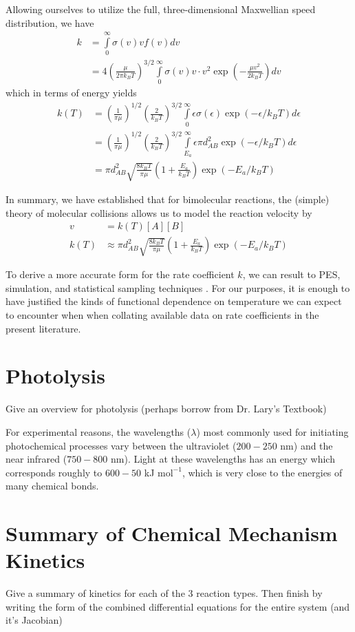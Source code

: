 Allowing ourselves to utilize the full, three-dimensional Maxwellian speed distribution, we have
\begin{equation}
  \begin{aligned}
  k &= \int\limits_0^\infty \sigma(v)v f(v) dv \\
  &= 4\left(\frac{\mu}{2\pi k_BT} \right)^{3/2}\int\limits_0^\infty \sigma(v)v \cdot v^2\exp\left(-\frac{\mu v^2}{2k_BT} \right)dv
  \end{aligned}
\end{equation}
which in terms of energy yields
\begin{equation}
  \begin{aligned}
  k(T) &= \left(\frac{1}{\pi \mu} \right)^{1/2}\left(\frac{2}{k_BT}\right)^{3/2}\int\limits_{0}^{\infty}\epsilon\sigma(\epsilon)\exp(-\epsilon/k_BT)d\epsilon \\
  &= \left(\frac{1}{\pi \mu} \right)^{1/2}\left(\frac{2}{k_BT}\right)^{3/2}\int\limits_{E_a}^{\infty}\epsilon\pi d_{AB}^2\exp(-\epsilon/k_BT)d\epsilon \\
  &= \pi d_{AB}^2 \sqrt{\frac{8k_BT}{\pi \mu}}\left(1 + \frac{E_a}{k_BT} \right)\exp(-E_a/k_BT)
  \end{aligned}
\end{equation}

In summary, we have established that for bimolecular reactions, the (simple) theory of molecular collisions allows us to model the reaction velocity by
\begin{align}
  v &= k(T)[A][B] \\
  k(T) &\approx \pi d_{AB}^2 \sqrt{\frac{8k_BT}{\pi \mu}}\left(1 + \frac{E_a}{k_BT}\right)\exp(-E_a/k_BT)
\end{align}

To derive a more accurate form for the rate coefficient $k$, we can result to PES, simulation, and statistical sampling techniques \cite[for example]{pes-h-h2, pes-for-k}. For our purposes, it is enough to have justified the kinds of functional dependence on temperature we can expect to encounter when when collating available data on rate coefficients in the present literature.

\section{Photolysis}

Give an overview for photolysis (perhaps borrow from Dr. Lary's Textbook)

For experimental reasons, the wavelengths ($\lambda$) most commonly used for initiating photochemical processes vary between the ultraviolet ($200-250$ nm) and the near infrared ($750-800$ nm). Light at these wavelengths has an energy which corresponds roughly to $600-50 $ kJ $\text{mol}^{-1}$, which is very close to the energies of many chemical bonds.



\section{Summary of Chemical Mechanism Kinetics}

Give a summary of kinetics for each of the 3 reaction types. Then finish by writing the form of the combined differential equations for the entire system (and it's Jacobian)
